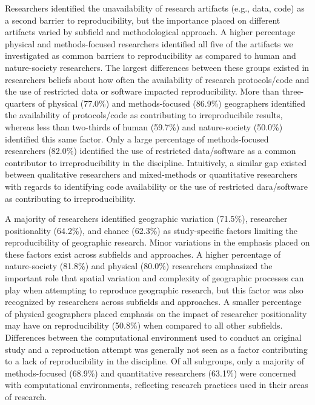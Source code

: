 \documentclass[]{interact}
\theoremstyle{plain}%
\theoremstyle{definition}
\theoremstyle{remark}
\begin{document}
Researchers identified the unavailability of research artifacts (e.g., data, code) as a second barrier to reproducibility, but the importance placed on different artifacts varied by subfield and methodological approach.
A higher percentage physical and methods-focused researchers identified all five of the artifacts we investigated as common barriers to reproducibility as compared to human and nature-society researchers.
The largest differences between these groups existed in researchers beliefs about how often the availability of research protocols/code and the use of restricted data or software impacted reproducibility.
More than three-quarters of physical (77.0\%) and methods-focused (86.9\%) geographers identified the availability of protocols/code as contributing to irreproducibile results, whereas less than two-thirds of human (59.7\%) and nature-society (50.0\%) identified this same factor. 
Only a large percentage of methods-focused researchers (82.0\%) identified the use of restricted data/software as a common contributor to irreproducibility in the discipline.
Intuitively, a similar gap existed between qualitative researchers and mixed-methods or quantitative researchers with regards to identifying code availability or the use of restricted dara/software as contributing to irreproducibility.

A majority of researchers identified geographic variation (71.5\%), researcher positionality (64.2\%), and chance (62.3\%) as study-specific factors limiting the reproducibility of geographic research.
Minor variations in the emphasis placed on these factors exist across subfields and approaches. 
A higher percentage of nature-society (81.8\%) and physical (80.0\%) researchers emphasized the important role that spatial variation and complexity of geographic processes can play when attempting to reproduce geographic research, but this factor was also recognized by researchers across subfields and approaches. 
A smaller percentage of physical geographers placed emphasis on the impact of researcher positionality may have on reproducibility (50.8\%) when compared to all other subfields.  
Differences between the computational environment used to conduct an original study and a reproduction attempt was generally not seen as a factor contributing to a lack of reproducibility in the discipline. 
Of all subgroups, only a majority of methods-focused (68.9\%) and quantitative researchers (63.1\%) were concerned with computational environments, reflecting research practices used in their areas of research.
\end{document}
